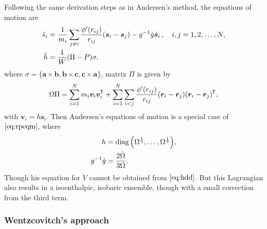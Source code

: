 Following the same derivation steps as in Andersen's method, the equations of motion are
\begin{subequations}
	\label{eq:rpeqm}
	\begin{align}
		\ddot{s}_i & = \frac{ 1 }{ m_i } \sum_{j\neq i}
		\frac{ \phi'(r_{ij}) }{ r_{ij} } (\bm{s}_i - \bm{s}_j) - g^{-1}\dot{g}
		\dot{ \bm{s} }_i \thinspace, \quad i, j = 1, 2, \ldots, N,\label{eq:rpsdd} \\
		\ddot{h}   & = \frac{ 1 }{ W } (\Pi - P) \sigma, \label{eq:hdd}
	\end{align}
\end{subequations}
where $\sigma = \{\bm{a}\times \bm{b},
	\bm{b}\times \bm{c}, \bm{c}\times \bm{a}\}$,
matrix $\Pi$ is given by
\begin{equation}\label{eq:pim&frr}
	\Omega \Pi = \sum_{i=1}^{N} m_i \bm{v}_i \bm{v}_i^{\mkern-1.5mu\mathsf{T}}
	+ \sum_{i=1}^{N} \sum_{i<j} \frac{ \phi'(r_{ij}) }{ r_{ij} }
	(\bm{r}_i - \bm{r}_j) (\bm{r}_i - \bm{r}_j)^{\mkern-1.5mu\mathsf{T}},
\end{equation}
with $\bm{v}_i = h \dot{ \bm{s}_i }$.
Then Andersen's equations of motion is a special case of
$\eqref{eq:rpeqm}$,
where
\begin{subequations}
	\begin{align}
		h              & = \operatorname{diag} \Big(  \Omega^{\frac{ 1 }{ 3 }}, \ldots,
		\Omega^{\frac{ 1 }{ 3 }}  \Big),                                  \\
		g^{-1} \dot{g} & =
		\frac{ 2 \dot{\Omega} }{3 \Omega }.
	\end{align}
\end{subequations}
Though his equation for
$\ddot{V}$ cannot be obtained from $\eqref{eq:hdd}$. But
this Lagrangian also results in a isoenthalpic, isobaric ensemble,
though with a small correction from the third term.


\subsubsection{Wentzcovitch's approach}

